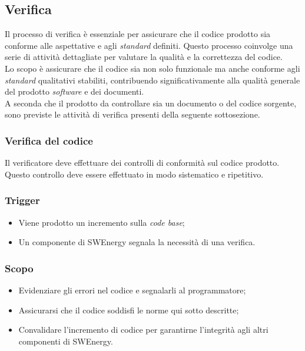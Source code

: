 \subsection{Verifica}
Il processo di verifica è essenziale per assicurare che il codice prodotto sia conforme alle aspettative e agli \textit{standard} definiti. 
Questo processo coinvolge una serie di attività dettagliate per valutare la qualità e la correttezza del codice.\\
Lo scopo è assicurare che il codice sia non solo funzionale ma anche conforme agli \textit{standard} qualitativi stabiliti, contribuendo significativamente alla qualità generale del prodotto \textit{software} e dei documenti.\\
A seconda che il prodotto da controllare sia un documento o del codice sorgente, sono previste le attività di verifica presenti della seguente sottosezione.

\subsubsection{Verifica del codice}
\label{verifica-codice}
Il verificatore deve effettuare dei controlli di conformità sul codice prodotto. 
Questo controllo deve essere effettuato in modo sistematico e ripetitivo.

\subsubsection*{Trigger}
\begin{itemize}
	\item Viene prodotto un incremento sulla \textit{code base};
	\item Un componente di SWEnergy segnala la necessità di una verifica.
\end{itemize}

\subsubsection*{Scopo}
\begin{itemize}
	\item Evidenziare gli errori nel codice e segnalarli al programmatore;
	\item Assicurarsi che il codice soddisfi le norme qui sotto descritte;
	\item Convalidare l'incremento di codice per garantirne l'integrità agli
	      altri componenti di SWEnergy.
\end{itemize}

